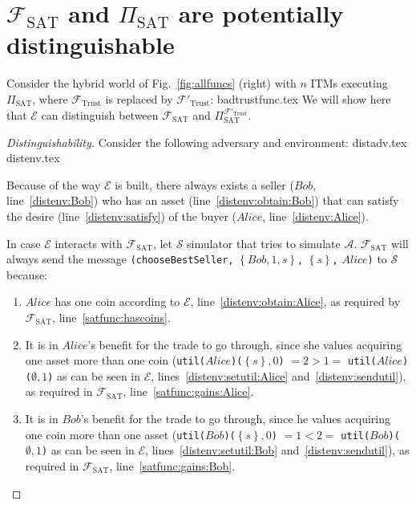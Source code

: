 \section{$\mathcal{F}_{\mathrm{SAT}}$ and $\Pi_{\mathrm{SAT}}$ are potentially
distinguishable}
  Consider the hybrid world of Fig.~\ref{fig:allfuncs} (right) with $n$ ITMs executing
  $\Pi_{\mathrm{SAT}}$, where $\mathcal{F}_{\mathrm{Trust}}$ is replaced by
  $\mathcal{F}'_{\mathrm{Trust}}$:
  {badtrustfunc.tex}
  We will show here that $\mathcal{E}$ can distinguish between
  $\mathcal{F}_{\mathrm{SAT}}$ and $\Pi_{\mathrm{SAT}}^{\mathcal{F}'_{\mathrm{Trust}}}$.
  \begin{proof}[Distinguishability]
    Consider the following adversary and environment:
    {distadv.tex}
    {distenv.tex}

    Because of the way $\mathcal{E}$ is built, there always exists a seller ($Bob$,
    line~\ref{distenv:Bob}) who has an asset (line~\ref{distenv:obtain:Bob}) that can
    satisfy the desire (line~\ref{distenv:satisfy}) of the buyer ($Alice$,
    line~\ref{distenv:Alice}).

    In case $\mathcal{E}$ interacts with $\mathcal{F}_{\mathrm{SAT}}$, let $\mathcal{S}$
    simulator that tries to simulate $\mathcal{A}$. $\mathcal{F}_{\mathrm{SAT}}$ will
    always send the message \texttt{(chooseBestSeller,} $\left\{Bob, 1,
    s\right\}$\texttt{,} $\left\{s\right\}$\texttt{,} $Alice$\texttt{)} to $\mathcal{S}$
    because:
    \begin{enumerate}
      \item $Alice$ has one coin according to $\mathcal{E}$,
      line~\ref{distenv:obtain:Alice}, as required by $\mathcal{F}_{\textrm{SAT}}$,
      line~\ref{satfunc:hascoins}.
      \item It is in $Alice$'s benefit for the trade to go through, since she values
      acquiring one asset more than one coin
      (\texttt{util(}$Alice$\texttt{)(}$\left\{s\right\}, 0$\texttt{)} $= 2 > 1 = $
      \texttt{util(}$Alice$\texttt{)(}$\emptyset, 1$\texttt{)} as can be seen in
      $\mathcal{E}$, lines~\ref{distenv:setutil:Alice} and~\ref{distenv:sendutil}), as
      required in $\mathcal{F}_{\textrm{SAT}}$, line~\ref{satfunc:gains:Alice}.
      \item It is in $Bob$'s benefit for the trade to go through, since he values
      acquiring one coin more than one asset
      (\texttt{util(}$Bob$\texttt{)(}$\left\{s\right\}, 0$\texttt{)} $= 1 < 2 = $
      \texttt{util(}$Bob$\texttt{)(}$\emptyset, 1$\texttt{)} as can be seen in
      $\mathcal{E}$, lines~\ref{distenv:setutil:Bob} and~\ref{distenv:sendutil}), as
      required in $\mathcal{F}_{\textrm{SAT}}$, line~\ref{satfunc:gains:Bob}.
    \end{enumerate}


\end{proof}
